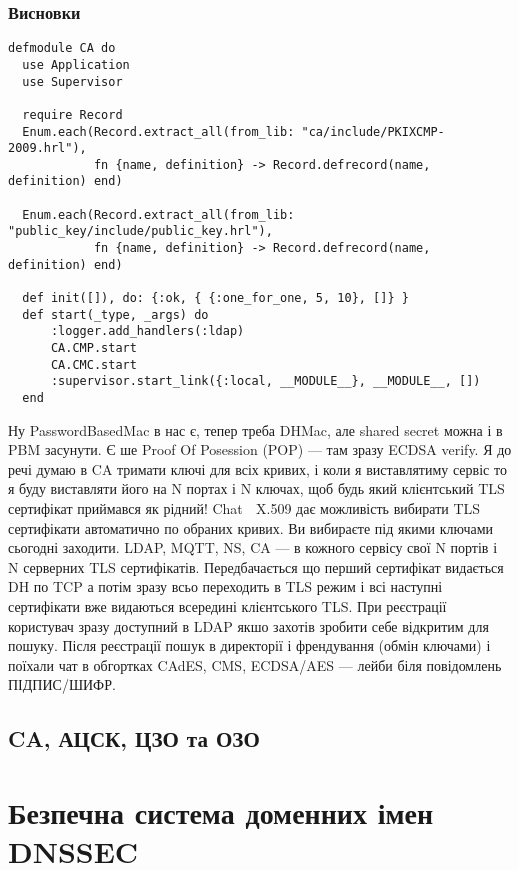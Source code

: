 \newpage
\subsubsection{Висновки}

\begin{lstlisting}
defmodule CA do
  use Application
  use Supervisor

  require Record
  Enum.each(Record.extract_all(from_lib: "ca/include/PKIXCMP-2009.hrl"),
            fn {name, definition} -> Record.defrecord(name, definition) end)

  Enum.each(Record.extract_all(from_lib: "public_key/include/public_key.hrl"),
            fn {name, definition} -> Record.defrecord(name, definition) end)

  def init([]), do: {:ok, { {:one_for_one, 5, 10}, []} }
  def start(_type, _args) do
      :logger.add_handlers(:ldap)
      CA.CMP.start
      CA.CMC.start
      :supervisor.start_link({:local, __MODULE__}, __MODULE__, [])
  end
\end{lstlisting}

Ну PasswordBasedMac в нас є, тепер треба DHMac, але shared secret можна і в PBM засунути. Є ше Proof Of Posession (POP) — там зразу ECDSA verify. Я до речі думаю в CA тримати ключі для всіх кривих, і коли я виставлятиму сервіс то я буду виставляти його на N портах і N ключах, щоб будь який клієнтський TLS сертифікат приймався як рідний! Chat 💬 X.509 дає можливість вибирати TLS сертифікати автоматично по обраних кривих. Ви вибираєте під якими ключами сьогодні заходити. LDAP, MQTT, NS, CA — в кожного сервісу свої N портів і N серверних TLS сертифікатів. Передбачається що перший сертифікат видається DH по TCP а потім зразу всьо переходить в TLS режим і всі наступні сертифікати вже видаються всередині клієнтського TLS. При реєстрації користувач зразу доступний в LDAP якшо захотів зробити себе відкритим для пошуку. Після реєстрації пошук в директорії і френдування (обмін ключами) і поїхали чат в обгортках CAdES, CMS, ECDSA/AES — лейби біля повідомлень ПІДПИС/ШИФР.

\subsection{CA, АЦСК, ЦЗО та ОЗО}

\section{Безпечна система доменних імен DNSSEC}

